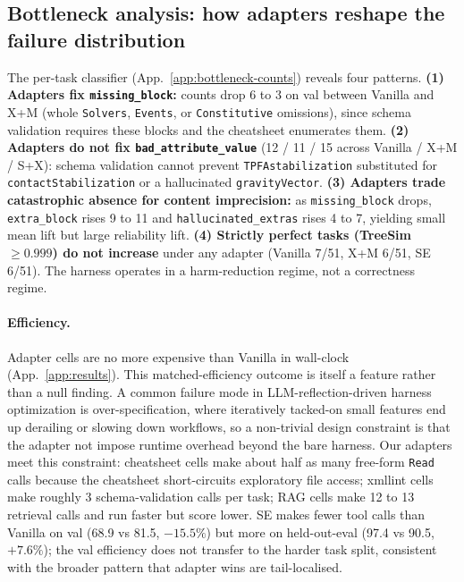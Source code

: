 \documentclass{article}
\begin{document}
\subsection{Bottleneck analysis: how adapters reshape the failure distribution}
\label{subsec:bottleneck-results}

The per-task classifier (App.~\ref{app:bottleneck-counts}) reveals four patterns. \textbf{(1) Adapters fix \texttt{missing\_block}:} counts drop 6 to 3 on val between Vanilla and X+M (whole \texttt{Solvers}, \texttt{Events}, or \texttt{Constitutive} omissions), since schema validation requires these blocks and the cheatsheet enumerates them. \textbf{(2) Adapters do not fix \texttt{bad\_attribute\_value}} (12 / 11 / 15 across Vanilla / X+M / S+X): schema validation cannot prevent \texttt{TPFAstabilization} substituted for \texttt{contactStabilization} or a hallucinated \texttt{gravityVector}. \textbf{(3) Adapters trade catastrophic absence for content imprecision:} as \texttt{missing\_block} drops, \texttt{extra\_block} rises 9 to 11 and \texttt{hallucinated\_extras} rises 4 to 7, yielding small mean lift but large reliability lift. \textbf{(4) Strictly perfect tasks (TreeSim $\geq 0.999$) do not increase} under any adapter (Vanilla 7/51, X+M 6/51, SE 6/51). The harness operates in a harm-reduction regime, not a correctness regime.

\paragraph{Efficiency.}\label{subsec:efficiency} Adapter cells are no more expensive than Vanilla in wall-clock (App.~\ref{app:results}). This matched-efficiency outcome is itself a feature rather than a null finding. A common failure mode in LLM-reflection-driven harness optimization is over-specification, where iteratively tacked-on small features end up derailing or slowing down workflows, so a non-trivial design constraint is that the adapter not impose runtime overhead beyond the bare harness. Our adapters meet this constraint: cheatsheet cells make about half as many free-form \texttt{Read} calls because the cheatsheet short-circuits exploratory file access; xmllint cells make roughly 3 schema-validation calls per task; RAG cells make 12 to 13 retrieval calls and run faster but score lower. SE makes fewer tool calls than Vanilla on val (68.9 vs 81.5, ${-}15.5\%$) but more on held-out-eval (97.4 vs 90.5, $+7.6\%$); the val efficiency does not transfer to the harder task split, consistent with the broader pattern that adapter wins are tail-localised.
\end{document}
